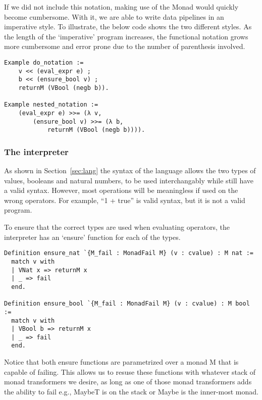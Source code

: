 If we did not include this notation, making use of the Monad would quickly
become cumbersome. With it, we are able to write data pipelines in an
imperative style. To illustrate, the below code shows the two
different styles. As the length of the `imperative' program increases, the
functional notation grows more cumbersome and error prone due to the number of
parenthesis involved.

\begin{listing}
\begin{verbatim}
Example do_notation :=
	v << (eval_expr e) ;
	b << (ensure_bool v) ;
	returnM (VBool (negb b)).

Example nested_notation :=
	(eval_expr e) >>= (λ v,
		(ensure_bool v) >>= (λ b,
			returnM (VBool (negb b)))).
\end{verbatim}
\end{listing}

\subsubsection{The interpreter}
As shown in Section~\ref{sec:lang} the syntax of the language allows the two
types of values, booleans and natural numbers, to be used interchangably while
still have a valid syntax. However, most operations will be meaningless if used
on the wrong operators. For example, ``1 + true'' is valid syntax, but it is 
not a valid program.

To ensure that the correct types are used when evaluating operators,
the interpreter has an `ensure' function for each of the types. 

\begin{listing}
\begin{verbatim}
Definition ensure_nat `{M_fail : MonadFail M} (v : cvalue) : M nat :=
  match v with
  | VNat x => returnM x
  | _ => fail
  end.
            
Definition ensure_bool `{M_fail : MonadFail M} (v : cvalue) : M bool :=
  match v with
  | VBool b => returnM x
  | _ => fail
  end.
\end{verbatim}
\end{listing}

Notice that both ensure functions are parametrized over a monad M that is
capable of failing. This allows us to resuse these functions with whatever
stack of monad transformers we desire, as long as one of those monad
transformers adds the ability to fail e.g., MaybeT is on the stack or Maybe is
the inner-most monad.

